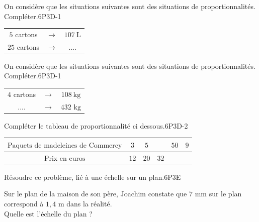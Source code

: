 \documentclass[a4paper,11pt,fleqn]{article}
\begin{document}
\begin{EXO}{On considère que les situations suivantes sont des situations de proportionnalités. Compléter.}{6P3D-1}

 \begin{tabular}[t]{ccc}
                       $5$ cartons & $\rightarrow$ & $107~\text{L}$ \\
                       $25$ cartons & $\rightarrow$ & .... \\
                       \end{tabular}
\end{EXO}

\begin{EXO}{On considère que les situations suivantes sont des situations de proportionnalités. Compléter.}{6P3D-1}

 \begin{tabular}[t]{ccc}
                       $4$ cartons & $\rightarrow$ & $108~\text{kg}$ \\
                       .... & $\rightarrow$ & $432 \text{ kg}$ \\
                       \end{tabular}
\end{EXO}

\begin{EXO}{Compléter le tableau de proportionnalité ci dessous.}{6P3D-2}

 \begin{tabular}{|c|c|c|c|c|c|}
\hline
 $\text{Paquets de madeleines de Commercy}$ &  $3$ &  $5$ &   &  $50$ &  $9$\\
\hline
 $\text{Prix en euros}$ &  $12$ &  $20$ &  $32$ &   &  \\
\hline
\end{tabular}
\end{EXO}

\begin{EXO}{Résoudre ce problème, lié à une échelle sur un plan.}{6P3E}

 Sur le plan de la maison de  son père, Joachim constate que $7$ mm sur le plan correspond à $1{,}4$ m dans la réalité.\\ Quelle est l'échelle du plan ? 
\end{EXO}
\end{document}
